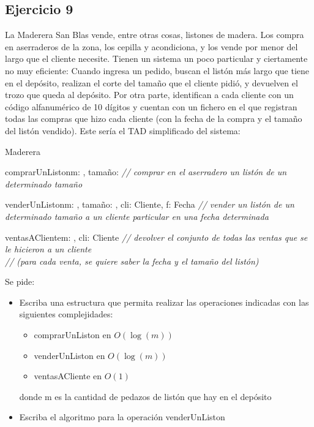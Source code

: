\subsection{Ejercicio 9}
La Maderera San Blas vende, entre otras cosas, listones de madera. Los compra en aserraderos de la zona, los cepilla y acondiciona, y los vende por menor del largo que el cliente necesite.
Tienen un sistema un poco particular y ciertamente no muy eficiente: Cuando ingresa un pedido, buscan el listón más largo que tiene en el depósito, realizan el corte del tamaño que el cliente pidió, y devuelven el trozo que queda al depósito.
Por otra parte, identifican a cada cliente con un código alfanumérico de 10 dígitos y cuentan con un fichero en el que registran todas las compras que hizo cada cliente (con la fecha de la compra y el tamaño del listón vendido).
Este sería el TAD simplificado del sistema:
\pagebreak

\begin{tad}{Maderera}{}
	\begin{proc}{comprarUnListon}{\Inout m: \tadtype, \In tamaño: \ent}{}
		\textit{// comprar en el aserradero un listón de un determinado tamaño}
	\end{proc}

	\begin{proc}{venderUnListon}{\Inout m: \tadtype, \In tamaño: \ent, \In cli: Cliente, \In f: Fecha}{}
		\textit{// vender un listón de un determinado tamaño a un cliente particular en una fecha determinada}
	\end{proc}

	\begin{proc}{ventasACliente}{\In m: \tadtype, \In cli: Cliente}{}
		\textit{// devolver el conjunto de todas las ventas que se le hicieron a un cliente} \\
		\textit{// (para cada venta, se quiere saber la fecha y el tamaño del listón)}
	\end{proc}
\end{tad}

Se pide:

\begin{itemize}
	\item Escriba una estructura que permita realizar las operaciones indicadas con las siguientes complejidades:

	      \begin{itemize}
		      \item comprarUnListon en $O(\log(m))$
		      \item venderUnListon en $O(\log(m))$
		      \item ventasACliente en $O(1)$
	      \end{itemize}

	      donde m es la cantidad de pedazos de listón que hay en el depósito

	\item Escriba el algoritmo para la operación venderUnListon
\end{itemize}

